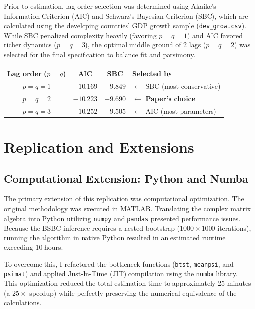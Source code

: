 \documentclass[11pt, a4paper]{article}
\begin{document}
Prior to estimation, lag order selection was determined using Akaike's Information Criterion (AIC) and Schwarz's Bayesian Criterion (SBC), which are calculated using the developing countries' GDP growth sample (\texttt{dev\_grow.csv}). While SBC penalized complexity heavily (favoring $p=q=1$) and AIC favored richer dynamics ($p=q=3$), the optimal middle ground of 2 lags ($p=q=2$) was selected for the final specification to balance fit and parsimony.
\begin{table}[h]
\centering
\begin{tabular}{c cc l}
\toprule
\textbf{Lag order ($p = q$)} & \textbf{AIC} & \textbf{SBC} & \textbf{Selected by} \\
\midrule
$p = q = 1$ & $-10.169$ & $\mathbf{-9.849}$ & $\leftarrow$ SBC (most conservative) \\
$p = q = 2$ & $-10.223$ & $-9.690$ & $\leftarrow$ \textbf{Paper's choice} \\
$p = q = 3$ & $\mathbf{-10.252}$ & $-9.505$ & $\leftarrow$ AIC (most parameters) \\
\bottomrule
\end{tabular}
\vspace{0.3em}
\end{table}

\section{Replication and Extensions}

\subsection{Computational Extension: Python and Numba}
The primary extension of this replication was computational optimization. The original methodology was executed in MATLAB. Translating the complex matrix algebra into Python utilizing \texttt{numpy} and \texttt{pandas} presented performance issues. Because the BSBC inference requires a nested bootstrap ($1000 \times 1000$ iterations), running the algorithm in native Python resulted in an estimated runtime exceeding 10 hours. 

To overcome this, I refactored the bottleneck functions (\texttt{btst}, \texttt{meanpsi}, and \texttt{psimat}) and applied Just-In-Time (JIT) compilation using the \texttt{numba} library. This optimization reduced the total estimation time to approximately 25 minutes (a $25\times$ speedup) while perfectly preserving the numerical equivalence of the calculations.
\end{document}
